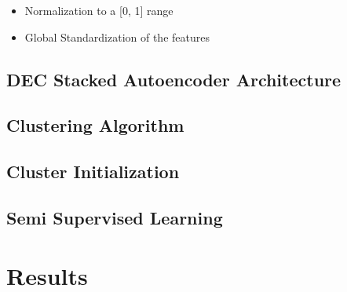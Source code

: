 \documentclass{article}
\begin{document}
\begin{itemize}
\item{Normalization to a [0, 1] range}
\item{Global Standardization of the features}
\end{itemize}




\subsection{DEC Stacked Autoencoder Architecture}

\subsection{Clustering Algorithm}

\subsection{Cluster Initialization}

\subsection{Semi Supervised Learning}





















\section{Results}
\end{document}
